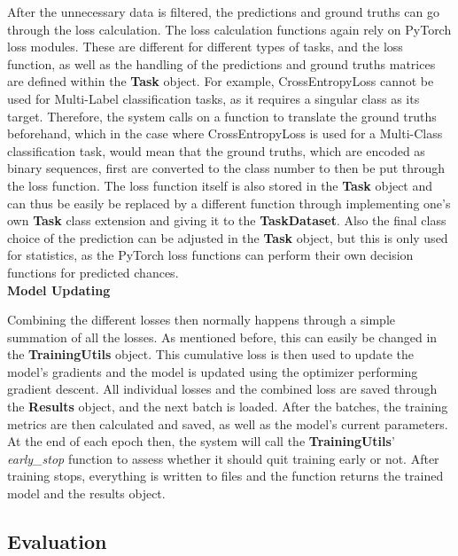 After the unnecessary data is filtered, the predictions and ground truths can go through the loss calculation. The loss calculation functions again rely on PyTorch loss modules. These are different for different types of tasks, and the loss function, as well as the handling of the predictions and ground truths matrices are defined within the \textbf{Task} object. For example, CrossEntropyLoss cannot be used for Multi-Label classification tasks, as it requires a singular class as its target. Therefore, the system calls on a function to translate the ground truths beforehand, which in the case where CrossEntropyLoss is used for a Multi-Class classification task, would mean that the ground truths, which are encoded as binary sequences, first are converted to the class number to then be put through the loss function. The loss function itself is also stored in the \textbf{Task} object and can thus be easily be replaced by a different function through implementing one's own \textbf{Task} class extension and giving it to the \textbf{TaskDataset}. Also the final class choice of the prediction can be adjusted in the \textbf{Task} object, but this is only used for statistics, as the PyTorch loss functions can perform their own decision functions for predicted chances. \\

\textbf{Model Updating}

Combining the different losses then normally happens through a simple summation of all the losses. As mentioned before, this can easily be changed in the \textbf{TrainingUtils} object. This cumulative loss is then used to update the model's gradients and the model is updated using the optimizer performing gradient descent. All individual losses and the combined loss are saved through the \textbf{Results} object, and the next batch is loaded. After the batches, the training metrics are then calculated and saved, as well as the model's current parameters.\\

At the end of each epoch then, the system will call the \textbf{TrainingUtils}' \textit{early\_stop} function to assess whether it should quit training early or not. After training stops, everything is written to files and the function returns the trained model and the results object.\\

\subsection{Evaluation} \label{Impl:Training:Evaluation}

